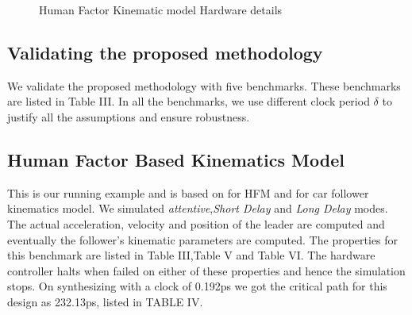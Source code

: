 {\begin{figure}
\begin{tikzpicture}[->,>=stealth',shorten >=1pt,auto,semithick,transform shape]
	\end{tikzpicture}
	\caption{Human Factor Kinematic model Hardware details} \label{fig:}
\end{figure}
\subsection {Validating the proposed methodology}
 We validate the proposed methodology with five benchmarks. These benchmarks are listed in Table III. In all the benchmarks, we use different clock period $\delta$
  to justify all the assumptions and ensure robustness. 
\begin{table}[htbp]
	
	\caption{Benchmark Details}
	\begin{center}
		\label{tab1}
	\end{center}
\end{table}
\subsection{Human Factor Based Kinematics Model} This is our running example and is based on \citep{Ro2018} for HFM and  \citep{bevrani2012evaluation} for car follower kinematics model. We simulated \textit{attentive},\textit{Short Delay} and \textit{Long Delay} modes. The actual acceleration, velocity and position of the leader are computed and eventually the follower's kinematic parameters are computed.
The properties for this benchmark are listed in Table III,Table V and Table VI. The hardware controller halts when failed on either of these properties and hence the simulation stops. On synthesizing with a clock of 0.192ps we got the critical path for this design as 232.13ps, listed in TABLE IV.

}
